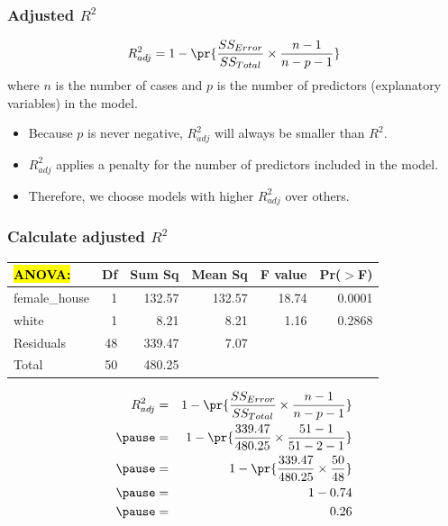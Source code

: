 
\begin{frame}
\frametitle{Adjusted $R^2$}

{\[ R^2_{adj} = 1 - \pr{ \frac{ SS_{Error} }{ SS_{Total} } \times \frac{n - 1}{n - p - 1} } \]
where $n$ is the number of cases and $p$ is the number of predictors (explanatory variables) in the model.
}

\begin{itemize}

\item Because $p$ is never negative, $R^2_{adj}$ will always be smaller than $R^2$.

\item $R^2_{adj}$ applies a penalty for the number of predictors included in the model.

\item Therefore, we choose models with higher $R^2_{adj}$ over others.

\end{itemize}

\end{frame}


\begin{frame}
\frametitle{Calculate adjusted $R^2$}

\begin{center}
\begin{tabular}{lrrrrr}
  \hline
\hl{ANOVA:} & Df & Sum Sq & Mean Sq & F value & Pr($>$F) \\ 
  \hline
female\_house & 1 & 132.57 & 132.57 & 18.74 & 0.0001 \\ 
  white & 1 & 8.21 & 8.21 & 1.16 & 0.2868 \\ 
  Residuals & 48 & 339.47 & 7.07 &  &  \\ 
   \hline
Total & 50 &    480.25\\
   \hline
\end{tabular}
\end{center}

\begin{eqnarray*}
R^2_{adj} &=& 1 - \pr{ \frac{ SS_{Error} }{ SS_{Total} } \times \frac{n - 1}{n - p - 1} } \\
\pause
&=& 1 - \pr{ \frac{ 339.47 }{ 480.25 } \times \frac{51 - 1}{51 - 2 - 1} }   \\
\pause
&=& 1- \pr{ \frac{ 339.47 }{ 480.25 } \times \frac{50}{48} } \\
\pause
&=& 1 -  0.74 \\
\pause
&=& 0.26
\end{eqnarray*}

\end{frame}
